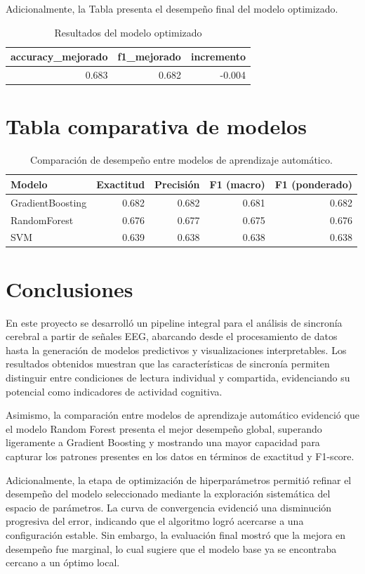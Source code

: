 \documentclass[12pt]{article}
\begin{document}
Adicionalmente, la Tabla presenta el desempeño final del modelo optimizado.

\begin{table}[H]
\centering
\caption{Resultados del modelo optimizado}
\begin{tabular}{rrr}
\toprule
accuracy_mejorado & f1_mejorado & incremento \\
\midrule
0.683 & 0.682 & -0.004 \\
\bottomrule
\end{tabular}

\end{table}

\section{Tabla comparativa de modelos}
\begin{table}[H]
\centering
\caption{Comparación de desempeño entre modelos de aprendizaje automático.}
\begin{tabular}{lrrrr}
\toprule
Modelo & Exactitud & Precisión & F1 (macro) & F1 (ponderado) \\
\midrule
GradientBoosting & 0.682 & 0.682 & 0.681 & 0.682 \\
RandomForest & 0.676 & 0.677 & 0.675 & 0.676 \\
SVM & 0.639 & 0.638 & 0.638 & 0.638 \\
\bottomrule
\end{tabular}

\end{table}

\section{Conclusiones}

En este proyecto se desarrolló un pipeline integral para el análisis de sincronía cerebral a partir de señales EEG, abarcando desde el procesamiento de datos hasta la generación de modelos predictivos y visualizaciones interpretables. Los resultados obtenidos muestran que las características de sincronía permiten distinguir entre condiciones de lectura individual y compartida, evidenciando su potencial como indicadores de actividad cognitiva.

Asimismo, la comparación entre modelos de aprendizaje automático evidenció que el modelo Random Forest presenta el mejor desempeño global, superando ligeramente a Gradient Boosting y mostrando una mayor capacidad para capturar los patrones presentes en los datos en términos de exactitud y F1-score.

Adicionalmente, la etapa de optimización de hiperparámetros permitió refinar el desempeño del modelo seleccionado mediante la exploración sistemática del espacio de parámetros. La curva de convergencia evidenció una disminución progresiva del error, indicando que el algoritmo logró acercarse a una configuración estable. Sin embargo, la evaluación final mostró que la mejora en desempeño fue marginal, lo cual sugiere que el modelo base ya se encontraba cercano a un óptimo local.
\end{document}
